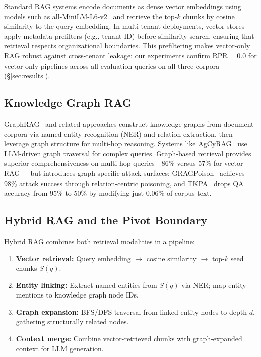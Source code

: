 \documentclass[letterpaper,twocolumn,10pt]{article}
\begin{document}
Standard RAG systems encode documents as dense vector embeddings using
models such as all-MiniLM-L6-v2~\cite{corpuspoisoning2023} and
retrieve the top-$k$ chunks by cosine similarity to the query
embedding. In multi-tenant deployments, vector stores apply metadata
prefilters (e.g., tenant ID) before similarity search, ensuring that
retrieval respects organizational boundaries. This prefiltering makes
vector-only RAG robust against cross-tenant leakage: our experiments
confirm $\text{RPR} = 0.0$ for vector-only pipelines across all
evaluation queries on all three corpora
(\S\ref{sec:results}).

\subsection{Knowledge Graph RAG}

GraphRAG~\cite{microsoftgraphrag2024} and related approaches
construct knowledge graphs from document corpora via named entity
recognition (NER) and relation extraction, then leverage graph
structure for multi-hop reasoning. Systems like
AgCyRAG~\cite{agcyrag2025} use LLM-driven graph traversal for
complex queries. Graph-based retrieval provides superior
comprehensiveness on multi-hop queries---86\% versus 57\% for vector
RAG~\cite{hybridrag2024}---but introduces graph-specific attack
surfaces: GRAGPoison~\cite{gragpoison2026} achieves 98\% attack
success through relation-centric poisoning, and TKPA~\cite{fewwords2025}
drops QA accuracy from 95\% to 50\% by modifying just 0.06\% of
corpus text.

\subsection{Hybrid RAG and the Pivot Boundary}

Hybrid RAG combines both retrieval modalities in a pipeline:

\begin{enumerate}
\item \textbf{Vector retrieval:} Query embedding $\rightarrow$ cosine
  similarity $\rightarrow$ top-$k$ seed chunks $S(q)$.
\item \textbf{Entity linking:} Extract named entities from $S(q)$ via
  NER; map entity mentions to knowledge graph node IDs.
\item \textbf{Graph expansion:} BFS/DFS traversal from linked entity
  nodes to depth $d$, gathering structurally related nodes.
\item \textbf{Context merge:} Combine vector-retrieved chunks with
  graph-expanded context for LLM generation.
\end{enumerate}
\end{document}
